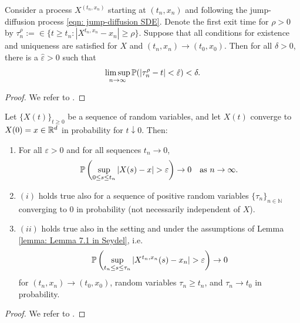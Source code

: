 \label{Appendix: Auxiliary Results for the Proof of the Existence of the Viscosity Solution}

\begin{lemma}
\label{lemma: Lemma 7.1 in Seydel}
    Consider a process $X^{(t_n,x_n)}$ starting at $(t_n,x_n)$ and following the jump-diffusion process \eqref{eqn: jump-diffusion SDE}. Denote the first exit time for $\rho >0$ by $\tau_n^\rho := \in \{t \geq t_n : |X^{t_n,x_n} - x_n| \geq \rho\}$. Suppose that all conditions for existence and uniqueness are satisfied for $X$ and $(t_n,x_n) \rightarrow (t_0,x_0)$. Then for all $\delta > 0$, there is a $\hat \varepsilon > 0$ such that 
    \begin{equation*}
        \limsup_{n \rightarrow \infty} \mathbb{P} (|\tau_n^\rho - t| < \hat \varepsilon) < \delta.
    \end{equation*}
\end{lemma}
\begin{proof}
    We refer to {\cite[Lemma 7.1]{seydel2010generalexistenceuniquenessviscosity}}.
\end{proof}

\begin{lemma}
\label{lemma: Lemma 7.2 in Seydel}
    Let $\{X(t)\}_{t \geq 0}$ be a sequence of random variables, and let $X(t)$ converge to $X(0) = x \in \mathbb{R}^d$ in probability for $t \downarrow 0$. Then:
    \begin{enumerate}[label=(\roman*)]
        \item For all $\varepsilon>0$ and for all sequences $t_n \rightarrow 0$, 
        \begin{equation*}
            \mathbb{P} \left( \sup_{0 \leq s \leq t_n} |X(s)-x| > \varepsilon \right) \rightarrow 0 \quad \text{as } n \rightarrow \infty.
        \end{equation*}
        \item $(i)$ holds true also for a sequence of positive random variables $\{\tau_n\}_{n \in \mathbb N}$ converging to $0$ in probability (not necessarily independent of $X$). 
        \item $(ii)$ holds true also in the setting and under the assumptions of Lemma \ref{lemma: Lemma 7.1 in Seydel}, i.e.
        \begin{equation*}
            \mathbb{P} \left( \sup_{t_n \leq s \leq \tau_n} |X^{t_n,x_n}(s) - x_n| > \varepsilon \right) \rightarrow 0
        \end{equation*}
        for $(t_n,x_n) \rightarrow (t_0,x_0)$, random variables $\tau_n \geq t_n$, and $\tau_n \rightarrow t_0$ in probability. 
    \end{enumerate}
\end{lemma}
\begin{proof}
    We refer to {\cite[Lemma 7.2]{seydel2010generalexistenceuniquenessviscosity}}.
\end{proof}